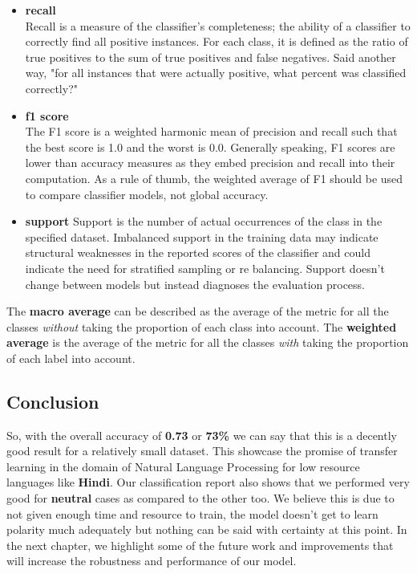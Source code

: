 \documentclass[a4paper, 12pt]{article}
\begin{document}
\begin{sloppypar}
\begin{itemize}
\item{\textbf{recall} \\ 
Recall is a measure of the classifier's completeness; the ability of a classifier to correctly find all positive instances. For each class, it is defined as the ratio of true positives to the sum of true positives and false negatives. Said another way, "for all instances that were actually positive, what percent was classified correctly?" }
\item{\textbf{f1 score} \\
The F1 score is a weighted harmonic mean of precision and recall such that the best score is 1.0 and the worst is 0.0. Generally speaking, F1 scores are lower than accuracy measures as they embed precision and recall into their computation. As a rule of thumb, the weighted average of F1 should be used to compare classifier models, not global accuracy.
}
\item{\textbf{support}
Support is the number of actual occurrences of the class in the specified dataset. Imbalanced support in the training data may indicate structural weaknesses in the reported scores of the classifier and could indicate the need for stratified sampling or re balancing. Support doesn't change between models but instead diagnoses the evaluation process. }
\end{itemize}
The \textbf{macro average} can be described as the average of the metric for all the classes \textit{without} taking the proportion of each class into account. The \textbf{weighted average} is the average of the metric for all the classes \textit{with} taking the proportion of each label into account.

\subsection{Conclusion}

So, with the overall accuracy of \textbf{0.73} or \textbf{73\%} we can say that this is a decently good result for a relatively small dataset. This showcase the promise of transfer learning in the domain of Natural Language Processing for low resource languages like \textbf{Hindi}. Our classification report also shows that we performed very good for \textbf{neutral} cases as compared to the other too. We believe this is due to not given enough time and resource to train, the model doesn't get to learn polarity much adequately but nothing can be said with certainty  at this point. In the next chapter, we highlight some of the future work and improvements that will increase the robustness and performance of our model.
  \clearpage

\end{sloppypar}
\end{document}
